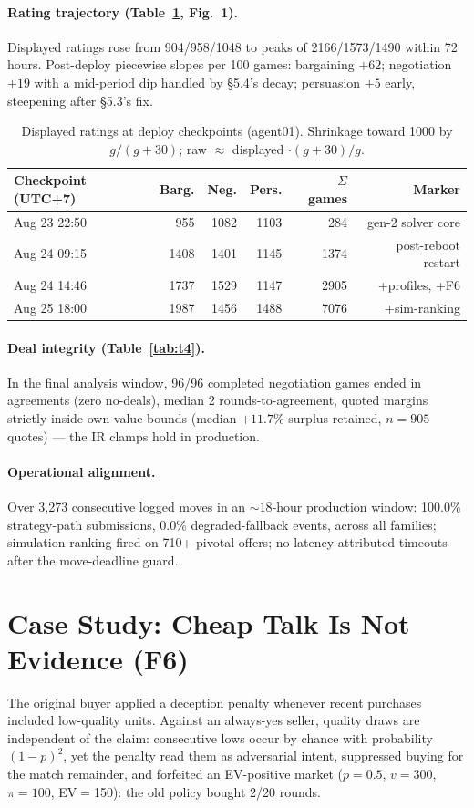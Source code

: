 \documentclass[11pt]{article}
\begin{document}
\paragraph{Rating trajectory (Table~\ref{tab:t1}, Fig.~1).} Displayed ratings rose from 904/958/1048 to peaks of 2166/1573/1490 within 72 hours. Post-deploy piecewise slopes per 100 games: bargaining $+62$; negotiation $+19$ with a mid-period dip handled by \S5.4's decay; persuasion $+5$ early, steepening after \S5.3's fix.

\begin{table}[t]\centering\small
\caption{Displayed ratings at deploy checkpoints (agent01). Shrinkage toward 1000 by $g/(g{+}30)$; raw $\approx$ displayed $\cdot (g{+}30)/g$.}
\label{tab:t1}
\begin{tabular}{lrrrrr}
\toprule
Checkpoint (UTC+7) & Barg. & Neg. & Pers. & $\Sigma$ games & Marker \\
\midrule
Aug 23 22:50 & 955 & 1082 & 1103 & 284 & gen-2 solver core \\
Aug 24 09:15 & 1408 & 1401 & 1145 & 1374 & post-reboot restart \\
Aug 24 14:46 & 1737 & 1529 & 1147 & 2905 & +profiles, +F6 \\
Aug 25 18:00 & 1987 & 1456 & 1488 & 7076 & +sim-ranking \\
\bottomrule
\end{tabular}
\end{table}

\paragraph{Deal integrity (Table~\ref{tab:t4}).} In the final analysis window, 96/96 completed negotiation games ended in agreements (zero no-deals), median 2 rounds-to-agreement, quoted margins strictly inside own-value bounds (median $+11.7\%$ surplus retained, $n{=}905$ quotes) --- the IR clamps hold in production.

\paragraph{Operational alignment.} Over 3{,}273 consecutive logged moves in an ${\sim}18$-hour production
window: 100.0\% strategy-path submissions, 0.0\% degraded-fallback events,
across all families; simulation ranking fired on 710+ pivotal offers; no
latency-attributed timeouts after the move-deadline guard.

\section{Case Study: Cheap Talk Is Not Evidence (F6)}
The original buyer applied a deception penalty whenever recent purchases included low-quality units. Against an always-yes seller, quality draws are independent of the claim: consecutive lows occur by chance with probability $(1-p)^2$, yet the penalty read them as adversarial intent, suppressed buying for the match remainder, and forfeited an EV-positive market ($p{=}0.5$, $v{=}300$, $\pi{=}100$, EV$=$150): the old policy bought 2/20 rounds.
\end{document}
